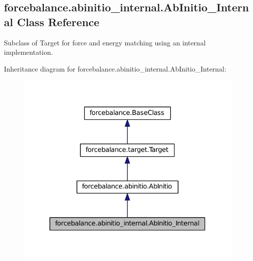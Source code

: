 \hypertarget{classforcebalance_1_1abinitio__internal_1_1AbInitio__Internal}{\subsection{forcebalance.\-abinitio\-\_\-internal.\-Ab\-Initio\-\_\-\-Internal \-Class \-Reference}
\label{classforcebalance_1_1abinitio__internal_1_1AbInitio__Internal}
}


\-Subclass of \-Target for force and energy matching using an internal implementation.  




\-Inheritance diagram for forcebalance.\-abinitio\-\_\-internal.\-Ab\-Initio\-\_\-\-Internal\-:\nopagebreak
\begin{figure}[H]
\begin{center}
\leavevmode
\includegraphics[width=316pt]{classforcebalance_1_1abinitio__internal_1_1AbInitio__Internal__inherit__graph}
\end{center}
\end{figure}


